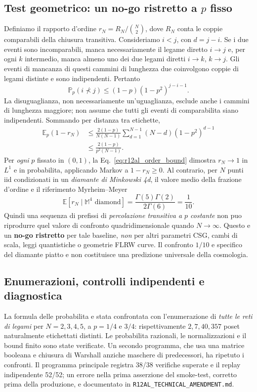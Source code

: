 \documentclass[11pt,a4paper]{article}
\begin{document}
\subsection{Test geometrico: un no-go ristretto a $p$ fisso}

Definiamo il rapporto d'ordine $r_N=R_N/\binom N2$, dove $R_N$ conta le coppie comparabili della chiusura transitiva. Consideriamo $i<j$, con $d=j-i$. Se i due eventi sono incomparabili, manca necessariamente il legame diretto $i\to j$ e, per ogni $k$ intermedio, manca almeno uno dei due legami diretti $i\to k$, $k\to j$. Gli eventi di mancanza di questi cammini di lunghezza due coinvolgono coppie di legami distinte e sono indipendenti. Pertanto
\begin{equation}
 \mathbb P_p(i\not\prec j)\le(1-p)(1-p^2)^{j-i-1}.
 \label{eq:r12al_pair_bound}
\end{equation}
La disuguaglianza, non necessariamente un'uguaglianza, esclude anche i cammini di lunghezza maggiore; non assume che tutti gli eventi di comparabilita siano indipendenti. Sommando per distanza tra etichette,
\begin{align}
 \mathbb E_p(1-r_N)&\le \frac{2(1-p)}{N(N-1)}
 \sum_{d=1}^{N-1}(N-d)(1-p^2)^{d-1}\\
 &\le \frac{2(1-p)}{p^2(N-1)}.
 \label{eq:r12al_order_bound}
\end{align}
Per \emph{ogni} $p$ fissato in $(0,1)$, la Eq.~\eqref{eq:r12al_order_bound} dimostra $r_N\to1$ in $L^1$ e in probabilita, applicando Markov a $1-r_N\ge0$. Al contrario, per $N$ punti iid condizionati in un \emph{diamante di Minkowski 4d}, il valore medio della frazione d'ordine e il riferimento Myrheim--Meyer \cite{Surya2019Review}
\begin{equation}
 \mathbb E[r_N\mid \mathbb M^4\text{ diamond}]
 =\frac{\Gamma(5)\Gamma(2)}{2\Gamma(6)}=\frac1{10}.
 \label{eq:r12al_4d_reference}
\end{equation}
Quindi una sequenza di prefissi di \emph{percolazione transitiva a $p$ costante} non puo riprodurre quel valore di confronto quadridimensionale quando $N\to\infty$. Questo e un \textbf{no-go ristretto} per tale baseline, \emph{non} per altri parametri CSG, cambi di scala, leggi quantistiche o geometrie FLRW curve. Il confronto $1/10$ e specifico del diamante piatto e non costituisce una predizione universale della cosmologia.

\subsection{Enumerazioni, controlli indipendenti e diagnostica}\label{subsec:r12al_valid}
La formula delle probabilita e stata confrontata con l'enumerazione di \emph{tutte le reti di legami} per $N=2,3,4,5$, a $p=1/4$ e $3/4$: rispettivamente $2,7,40,357$ poset naturalmente etichettati distinti. Le probabilita razionali, le normalizzazioni e il bound finito sono state verificate. Un secondo programma, che usa una matrice booleana e chiusura di Warshall anziche maschere di predecessori, ha ripetuto i confronti. Il programma principale registra 38/38 verifiche superate e il replay indipendente 52/52; un errore nella prima asserzione del smoke-test, corretto prima della produzione, e documentato in \texttt{R12AL\_TECHNICAL\_AMENDMENT.md}.
\end{document}
